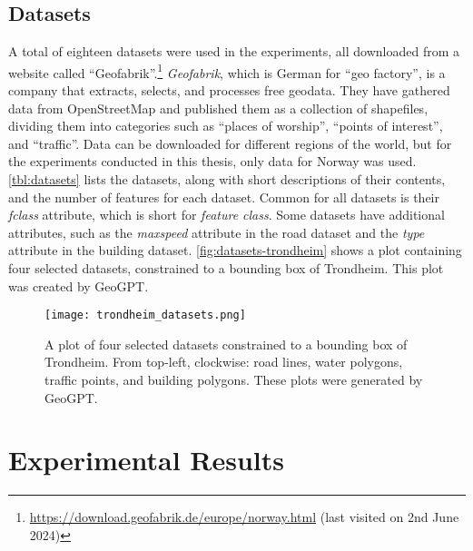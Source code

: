 \subsection{Datasets}
\label{sec:datasets}

A total of eighteen datasets were used in the experiments, all downloaded from a website called \enquote{Geofabrik}.\footnote{\url{https://download.geofabrik.de/europe/norway.html} (last visited on 2nd June 2024)} \textit{Geofabrik}, which is German for \enquote{geo factory}, is a company that extracts, selects, and processes free geodata. They have gathered data from OpenStreetMap and published them as a collection of shapefiles, dividing them into categories such as \enquote{places of worship}, \enquote{points of interest}, and \enquote{traffic}. Data can be downloaded for different regions of the world, but for the experiments conducted in this thesis, only data for Norway was used. \autoref{tbl:datasets} lists the datasets, along with short descriptions of their contents, and the number of features for each dataset. Common for all datasets is their \emph{fclass} attribute, which is short for \emph{feature class}. Some datasets have additional attributes, such as the \emph{maxspeed} attribute in the road dataset and the \emph{type} attribute in the building dataset. \autoref{fig:datasets-trondheim} shows a plot containing four selected datasets, constrained to a bounding box of Trondheim. This plot was created by GeoGPT.



\begin{figure}
    \centering
    \texttt{[image: trondheim\_datasets.png]}
    \caption[A plot of four selected datasets constrained to a bounding box of Trondheim]{A plot of four selected datasets constrained to a bounding box of Trondheim. From top-left, clockwise: road lines, water polygons, traffic points, and building polygons. These plots were generated by GeoGPT.}
    \label{fig:datasets-trondheim}
\end{figure}

\FloatBarrier


\section{Experimental Results}
\label{sec:experimental-results}

